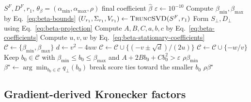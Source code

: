\begin{algorithm}[t]
\caption{\textsc{SelectBeta}: fixed-projection selection}
\label{alg:select-beta}
\small
\begin{algorithmic}[1]
\Require $S^F,D^F,r_1$, $\theta_\beta=(\alpha_{\min},\alpha_{\max},\rho)$
\Ensure final coefficient $\widehat\beta$
\State $\varepsilon\gets10^{-10}$
\State Compute $\beta_{\min},\beta_{\max}$ by Eq.~\eqref{eq:beta-bounds}
\State $(U_{r_1},\Sigma_{r_1},V_{r_1})\gets\Call{TruncSVD}{S^F,r_1}$
\State Form $S_\perp,D_\perp$ using Eq.~\eqref{eq:beta-projection}
\State Compute $A,B,C,a,b,c$ by Eq.~\eqref{eq:beta-coefficients}
\State Compute $u,v,w$ by Eq.~\eqref{eq:beta-stationary-coefficients}
\State $\mathcal C\gets\{\beta_{\min},\beta_{\max}\}$
    \State $d\gets v^2-4uw$
        \State $\mathcal C\gets\mathcal C\cup\{(-v\pm\sqrt d)/(2u)\}$
    \EndIf
{}
    \State $\mathcal C\gets\mathcal C\cup\{-w/v\}$
\EndIf
\State Keep $b_0\in\mathcal C$ with $\beta_{\min}\le b_0\le\beta_{\max}$
\Statex \hspace{\algorithmicindent} and $A+2Bb_0+Cb_0^2>\varepsilon$
    \State \Return $\rho\beta_{\min}$
\EndIf
\State $\beta^\star\gets\arg\min_{b_0\in\mathcal C}q_\perp(b_0)$
\Statex \hspace{\algorithmicindent} break score ties toward the smaller $b_0$
\State \Return $\rho\beta^\star$
\end{algorithmic}
\end{algorithm}


\subsection{Gradient-derived Kronecker factors}\label{sup:fisher-estimation}

